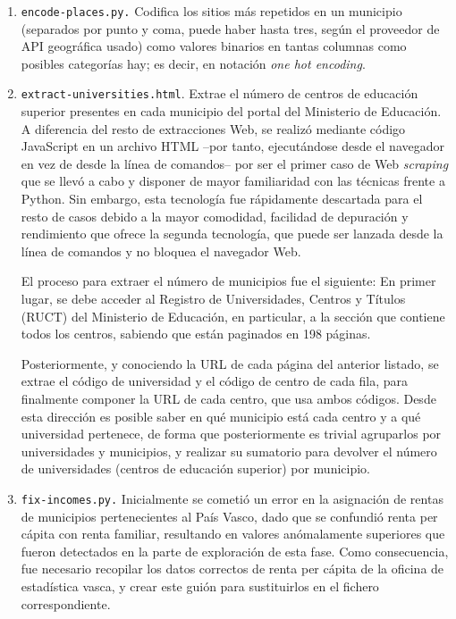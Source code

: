\begin{enumerate}
    \item \texttt{encode-places.py.} Codifica los sitios más repetidos en un municipio (separados por punto y coma, puede haber hasta tres, según el proveedor de API geográfica usado) como valores binarios en tantas columnas como posibles categorías hay; es decir, en notación \textit{one hot encoding}.
    
    \item \texttt{extract-universities.html}. Extrae el número de centros de educación superior presentes en cada municipio del portal del Ministerio de Educación. A diferencia del resto de extracciones Web, se realizó mediante código JavaScript en un archivo HTML –por tanto, ejecutándose desde el navegador en vez de desde la línea de comandos– por ser el primer caso de Web \textit{scraping} que se llevó a cabo y disponer de mayor familiaridad con las técnicas frente a Python. Sin embargo, esta tecnología fue rápidamente descartada para el resto de casos debido a la mayor comodidad, facilidad de depuración y rendimiento que ofrece la segunda tecnología, que puede ser lanzada desde la línea de comandos y no bloquea el navegador Web.

    El proceso para extraer el número de municipios fue el siguiente: En primer lugar, se debe acceder al Registro de Universidades, Centros y Títulos (RUCT) del Ministerio de Educación, en particular, a la sección que contiene todos los centros, sabiendo que están paginados en 198 páginas.

    Posteriormente, y conociendo la URL de cada página del anterior listado, se extrae el código de universidad y el código de centro de cada fila, para finalmente componer la URL de cada centro, que usa ambos códigos. Desde esta dirección es posible saber en qué municipio está cada centro y a qué universidad pertenece, de forma que posteriormente es trivial agruparlos por universidades y municipios, y realizar su sumatorio para devolver el número de universidades (centros de educación superior) por municipio.

    
    \item \texttt{fix-incomes.py.} Inicialmente se cometió un error en la asignación de rentas de municipios pertenecientes al País Vasco, dado que se confundió renta per cápita con renta familiar, resultando en valores anómalamente superiores que fueron detectados en la parte de exploración de esta fase. Como consecuencia, fue necesario recopilar los datos correctos de renta per cápita de la oficina de estadística vasca, y crear este guión para sustituirlos en el fichero correspondiente.


\end{enumerate}
